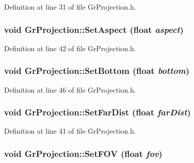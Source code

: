 Definition at line 31 of file GrProjection.h.\hypertarget{class_gr_projection_ecaec8627848803b87a11bd3638c2664}{
\subsubsection[{SetAspect}]{\setlength{\rightskip}{0pt plus 5cm}void GrProjection::SetAspect (float {\em aspect})}}
\label{class_gr_projection_ecaec8627848803b87a11bd3638c2664}




Definition at line 42 of file GrProjection.h.\hypertarget{class_gr_projection_f2103c25c9b29dccb2630e671b486147}{
\subsubsection[{SetBottom}]{\setlength{\rightskip}{0pt plus 5cm}void GrProjection::SetBottom (float {\em bottom})}}
\label{class_gr_projection_f2103c25c9b29dccb2630e671b486147}




Definition at line 46 of file GrProjection.h.\hypertarget{class_gr_projection_3671a2d19ad8e30a24968fbe105563ee}{
\subsubsection[{SetFarDist}]{\setlength{\rightskip}{0pt plus 5cm}void GrProjection::SetFarDist (float {\em farDist})}}
\label{class_gr_projection_3671a2d19ad8e30a24968fbe105563ee}




Definition at line 41 of file GrProjection.h.\hypertarget{class_gr_projection_f4b558c458d3a59acd574af5d7f84850}{
\subsubsection[{SetFOV}]{\setlength{\rightskip}{0pt plus 5cm}void GrProjection::SetFOV (float {\em fov})}}
\label{class_gr_projection_f4b558c458d3a59acd574af5d7f84850}




